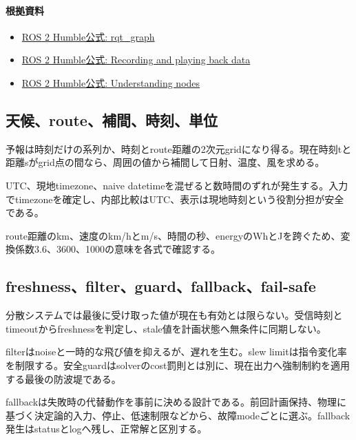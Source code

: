 \documentclass[a4paper,11pt]{article}
\begin{document}
\paragraph{根拠資料}
\begin{itemize}[leftmargin=1.6em]
\item \href{https://docs.ros.org/en/ros2_packages/humble/api/rqt_graph/index.html}{ROS 2 Humble公式: rqt\_graph}
\item \href{https://docs.ros.org/en/humble/Tutorials/Beginner-CLI-Tools/Recording-And-Playing-Back-Data/Recording-And-Playing-Back-Data.html}{ROS 2 Humble公式: Recording and playing back data}
\item \href{https://docs.ros.org/en/humble/Tutorials/Beginner-CLI-Tools/Understanding-ROS2-Nodes/Understanding-ROS2-Nodes.html}{ROS 2 Humble公式: Understanding nodes}
\end{itemize}

\subsection{天候、route、補間、時刻、単位}
予報は時刻だけの系列か、時刻とroute距離の2次元gridになり得る。現在時刻tと距離sがgrid点の間なら、周囲の値から補間して日射、温度、風を求める。


UTC、現地timezone、naive datetimeを混ぜると数時間のずれが発生する。入力でtimezoneを確定し、内部比較はUTC、表示は現地時刻という役割分担が安全である。


route距離のkm、速度のkm/hとm/s、時間の秒、energyのWhとJを跨ぐため、変換係数3.6、3600、1000の意味を各式で確認する。



\subsection{freshness、filter、guard、fallback、fail-safe}
分散システムでは最後に受け取った値が現在も有効とは限らない。受信時刻とtimeoutからfreshnessを判定し、stale値を計画状態へ無条件に同期しない。


filterはnoiseと一時的な飛び値を抑えるが、遅れを生む。slew limitは指令変化率を制限する。安全guardはsolverのcost罰則とは別に、現在出力へ強制制約を適用する最後の防波堤である。


fallbackは失敗時の代替動作を事前に決める設計である。前回計画保持、物理に基づく決定論的入力、停止、低速制限などから、故障modeごとに選ぶ。fallback発生はstatusとlogへ残し、正常解と区別する。
\end{document}
